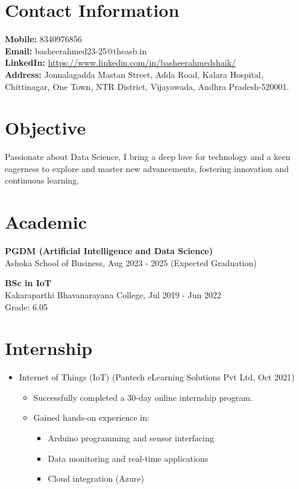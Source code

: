 \documentclass[letterpaper,10pt]{article}
\begin{document}
\begin{multicols}{2}

\section*{Contact Information}
\textbf{Mobile:} 8340976856 \\
\textbf{Email:} basheerahmed23-25@theasb.in \\
\textbf{LinkedIn:}
\url{https://www.linkedin.com/in/basheerahmedshaik/}\\
\textbf{Address:}
Jonnalagadda Mastan Street, Adda Road, Kalara Hospital, Chittinagar, One Town, NTR District, Vijayawada, Andhra Pradesh-520001.

\section*{Objective}
Passionate about Data Science, I bring a deep love for technology and a keen eagerness to explore and master new advancements, fostering innovation and continuous learning.
\section*{Academic}
\textbf{PGDM (Artificial Intelligence and Data Science)} \\
Ashoka School of Business, Aug 2023 - 2025 (Expected Graduation)

\textbf{BSc in IoT} \\
Kakaraparthi Bhavanarayana College, Jul 2019 - Jun 2022 \\
Grade: 6.05

\section{Internship}

\begin{itemize}
    \item Internet of Things (IoT) (Pantech eLearning Solutions Pvt Ltd, Oct 2021)
        \begin{itemize}
            \item Successfully completed a 30-day online internship program.
            \item Gained hands-on experience in:
                \begin{itemize}
                    \item Arduino programming and sensor interfacing
                    \item Data monitoring and real-time applications
                    \item Cloud integration (Azure)
                \end{itemize}
        \end{itemize}
\end{itemize}




\end{multicols}
\end{document}
